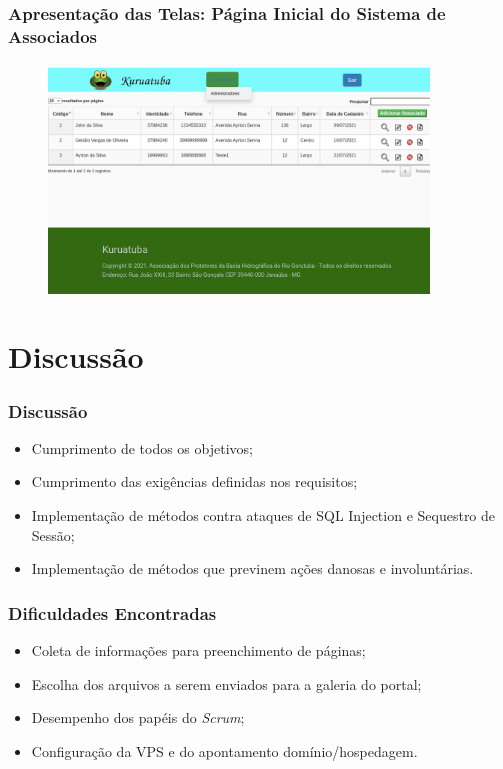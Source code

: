 \documentclass{beamer}
\begin{document}
\begin{frame}
    \frametitle{Apresentação das Telas: Página Inicial do Sistema de Associados}
    \begin{figure}[htb]
        \centering
        \includegraphics[width=0.9\textwidth]{../figuras/kuruatuba_sistema_home.png}
        \label{fig:home-sistema}
    \end{figure}
\end{frame}



\section{Discussão}
\begin{frame}
    \frametitle{Discussão}
    \begin{itemize}
        \item Cumprimento de todos os objetivos;
        \item Cumprimento das exigências definidas nos requisitos;
        \item Implementação de métodos contra ataques de SQL Injection e Sequestro de Sessão; %
        \item Implementação de métodos que previnem ações danosas e involuntárias. %
    \end{itemize}
\end{frame}


\begin{frame}
    \frametitle{Dificuldades Encontradas}
    \begin{itemize}
     \item Coleta de informações para preenchimento de páginas;
     \item Escolha dos arquivos a serem enviados para a galeria do portal;
     \item Desempenho dos papéis do \textit{Scrum}; %
     \item Configuração da VPS e do apontamento domínio/hospedagem.
    \end{itemize}

\end{frame}
\end{document}
